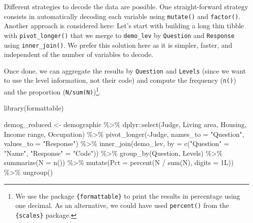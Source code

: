 \documentclass[
]{krantz}
\makeatletter
\newenvironment{Shaded}{\begin{snugshade}}{\end{snugshade}}
\newcommand{\AttributeTok}[1]{\textcolor[rgb]{0.61,0.61,0.61}{#1}}
\newcommand{\FunctionTok}[1]{\textcolor[rgb]{0,0,0}{#1}}
\newcommand{\NormalTok}[1]{#1}
\newcommand{\OtherTok}[1]{\textcolor[rgb]{0.37,0.37,0.37}{#1}}
\newcommand{\SpecialCharTok}[1]{\textcolor[rgb]{0,0,0}{#1}}
\newcommand{\StringTok}[1]{\textcolor[rgb]{0.5,0.5,0.5}{#1}}
\newenvironment{kframe}{%
\medskip{}
\setlength{\fboxsep}{.8em}
 \def\at@end@of@kframe{}%
 \ifinner\ifhmode%
  \def\at@end@of@kframe{\end{minipage}}%
  \begin{minipage}{\columnwidth}%
 \fi\fi%
 \def\FrameCommand##1{\hskip\@totalleftmargin \hskip-\fboxsep
 \colorbox{shadecolor}{##1}\hskip-\fboxsep
     \hskip-\linewidth \hskip-\@totalleftmargin \hskip\columnwidth}%
 \MakeFramed {\advance\hsize-\width
   \@totalleftmargin\z@ \linewidth\hsize
   \@setminipage}}%
 {\par\unskip\endMakeFramed%
 \at@end@of@kframe}
\renewenvironment{Shaded}{\begin{kframe}}{\end{kframe}}
\makeatother
\begin{document}
Different strategies to decode the data are possible. One straight-forward strategy consists in automatically decoding each variable using \texttt{mutate()} and \texttt{factor()}. Another approach is considered here: Let's start with building a long thin tibble with \texttt{pivot\_longer()} that we merge to \texttt{demo\_lev} by \texttt{Question} and \texttt{Response} using \texttt{inner\_join()}. We prefer this solution here as it is simpler, faster, and independent of the number of variables to decode.

Once done, we can aggregate the results by \texttt{Question} and \texttt{Levels} (since we want to use the level information, not their code) and compute the frequency (\texttt{n()}) and the proportion (\texttt{N/sum(N)})\footnote{We use the package \texttt{\{formattable\}} to print the results in percentage using one decimal. As an alternative, we could have used \texttt{percent()} from the \texttt{\{scales\}} package.}.

\begin{Shaded}
\begin{Highlighting}[]
\FunctionTok{library}\NormalTok{(formattable)}

\NormalTok{demog\_reduced }\OtherTok{\textless{}{-}}\NormalTok{ demographic }\SpecialCharTok{\%\textgreater{}\%}
\NormalTok{  dplyr}\SpecialCharTok{::}\FunctionTok{select}\NormalTok{(Judge, }\StringTok{\textasciigrave{}}\AttributeTok{Living area}\StringTok{\textasciigrave{}}\NormalTok{, Housing, }
                \StringTok{\textasciigrave{}}\AttributeTok{Income range}\StringTok{\textasciigrave{}}\NormalTok{, }\StringTok{\textasciigrave{}}\AttributeTok{Occupation}\StringTok{\textasciigrave{}}\NormalTok{) }\SpecialCharTok{\%\textgreater{}\%}
  \FunctionTok{pivot\_longer}\NormalTok{(}\SpecialCharTok{{-}}\NormalTok{Judge, }
               \AttributeTok{names\_to =} \StringTok{"Question"}\NormalTok{, }\AttributeTok{values\_to =} \StringTok{"Response"}\NormalTok{) }\SpecialCharTok{\%\textgreater{}\%}
  \FunctionTok{inner\_join}\NormalTok{(demo\_lev, }\AttributeTok{by =} \FunctionTok{c}\NormalTok{(}\StringTok{"Question"} \OtherTok{=} \StringTok{"Name"}\NormalTok{, }
                              \StringTok{"Response"} \OtherTok{=} \StringTok{"Code"}\NormalTok{)) }\SpecialCharTok{\%\textgreater{}\%}
  \FunctionTok{group\_by}\NormalTok{(Question, Levels) }\SpecialCharTok{\%\textgreater{}\%}
  \FunctionTok{summarize}\NormalTok{(}\AttributeTok{N =} \FunctionTok{n}\NormalTok{()) }\SpecialCharTok{\%\textgreater{}\%}
  \FunctionTok{mutate}\NormalTok{(}\AttributeTok{Pct =} \FunctionTok{percent}\NormalTok{(N }\SpecialCharTok{/} \FunctionTok{sum}\NormalTok{(N), }\AttributeTok{digits =}\NormalTok{ 1L)) }\SpecialCharTok{\%\textgreater{}\%}
  \FunctionTok{ungroup}\NormalTok{()}
\end{Highlighting}
\end{Shaded}
\end{document}
